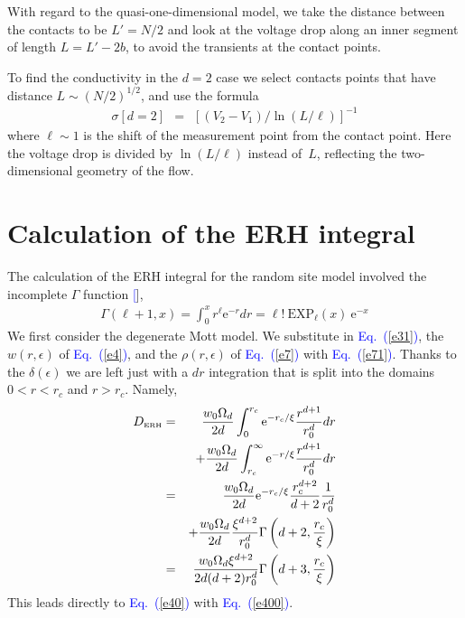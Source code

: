 \documentclass[aps,pre,floats,floatfix,twocolumn]{revtex4}
\newcommand{\eexp}{\mbox{e}^}
\newcommand{\tbox}[1]{\mbox{\tiny #1}}
\newcommand{\beq}{\begin{eqnarray}}
\newcommand{\eeq}{\end{eqnarray}}
\newcommand{\Eq}[1]{\textcolor{blue}{Eq.\!\!~(\ref{#1})}}
\renewcommand{\cite}[1]{\textcolor{blue}{[\onlinecite{#1}}]} %
\begin{document}
With regard to the quasi-one-dimensional model, 
we take the distance between the contacts to 
be ${L'=N/2}$  and look at the voltage drop along 
an inner segment of length ${L=L'-2b}$, 
to avoid the transients at the contact points.

To find the conductivity in the $d{=}2$ case 
we select contacts points that have 
distance ${L\sim (N/2)^{1/2}}$, and use the formula 
%
\beq
\sigma [d{=}2] \ \ = \ \ \left[(V_2-V_1)/\ln(L/\ell)\right]^{-1} 
\eeq
%
where $\ell \sim 1$ is the shift of the measurement point
from the contact point. Here the voltage drop 
is divided by $\ln(L/\ell)$ instead of~$L$, 
reflecting the two-dimensional geometry of the flow.


\section{Calculation of the ERH integral}
\label{aERH}

The calculation of the ERH integral for the random site model 
involved the incomplete $\Gamma$ function \cite{gamma}, 
%
\beq
\Gamma(\ell{+}1,x) = \int_0^x r^{\ell} \eexp{-r} dr = 
\ell! \ \mbox{EXP}_{\ell}(x)  \ \eexp{-x}
\eeq
%
We first consider the degenerate Mott model. 
We substitute in \Eq{e31},  
the $w(r,\epsilon)$ of \Eq{e4}, 
and the $\rho(r,\epsilon)$ of \Eq{e7} with \Eq{e71}.
Thanks to the $\delta(\epsilon)$ we are left 
just with a $dr$ integration that is split  
into the domains ${0<r<r_c}$ and ${r>r_c}$. 
Namely, 
%
\beq
D_{\tbox{ERH}} &=& 
\frac{w_0\Omega_d}{2d}\int_0^{r_c} \eexp{-r_c / \xi} \frac{r^{d+1}}{r_0^d} dr 
\nonumber \\
&&+ \frac{w_0\Omega_d}{2d}\int_{r_c}^\infty \eexp{-r / \xi} \frac{r^{d+1}}{r_0^d} dr 
\nonumber \\
&=& \frac{w_0\Omega_d}{2d} \eexp{-r_c / \xi} \frac{r_c^{d+2}}{d+2} \frac{1}{r_0^d}
\nonumber \\
&&+\frac{w_0\Omega_d}{2d} \frac{\xi^{d+2}}{r_0^d} \Gamma\left(d+2,\frac{r_c}{\xi}\right)
\nonumber \\
&=& \frac{w_0\Omega_d \xi^{d+2}}{2d(d+2)r_0^d}\Gamma\left(d+3,\frac{r_c}{\xi}\right)
\eeq
%
This leads directly to \Eq{e40} with \Eq{e400}.
\end{document}
